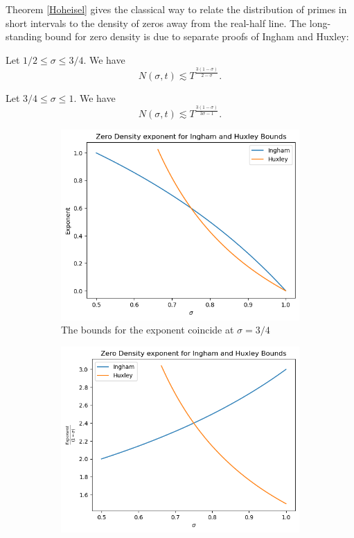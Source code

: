 Theorem \ref{Hoheisel} gives the classical way to relate the distribution of primes in short intervals to the density of zeros away from the real-half line. The long-standing bound for zero density is due to separate proofs of Ingham and Huxley:
\begin{theorem}
    Let $1/2\leq \sigma\leq 3/4$. We have \[
        N(\sigma,t)\lesssim T^{\frac{3(1-\sigma)}{2-\sigma}}.
        \]
\end{theorem}
\begin{theorem}
    Let $3/4\leq \sigma\leq 1$. We have \[
        N(\sigma,t)\lesssim T^{\frac{3(1-\sigma)}{3\sigma-1}}.
        \]
\end{theorem}

\begin{figure}[h]
    \centering
    \begin{subfigure}{0.4\textwidth}
        \includegraphics[width=\textwidth]{inghamhuxley1.png}
        \caption{The bounds for the exponent coincide at $\sigma=3/4$}
    \end{subfigure}
    \begin{subfigure}{0.4\textwidth}
        \includegraphics[width=\textwidth]{inghamhuxley2.png}

\end{subfigure}
\end{figure}
